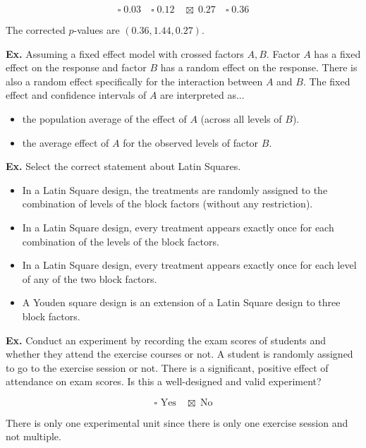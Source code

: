 $$\square \; 0.03 \quad \square \; 0.12 \quad \boxtimes \; 0.27 \quad \square \; 0.36 $$

The corrected $p$-values are $(0.36, 1.44, 0.27)$.


\hrulefill

\textbf{Ex.} Assuming a fixed effect model with crossed factors $A, B$. Factor $A$ has a fixed effect on the response and factor $B$ has a random effect on the response. There is also a random effect specifically for the interaction between $A$ and $B$. The fixed effect and confidence intervals of $A$ are interpreted as...

\begin{itemize}
	\item[$\boxtimes$] the population average of the effect of $A$ (across all levels of $B$).
	\item[$\square$] the average effect of $A$ for the observed levels of factor $B$.
\end{itemize}


\hrulefill

\textbf{Ex.} Select the correct statement about Latin Squares.

\begin{itemize}
	\item[$\square$] In a Latin Square design, the treatments are randomly assigned to the combination of levels of the block factors (without any restriction).
	\item[$\square$] In a Latin Square design, every treatment appears exactly once for each combination of the levels of the block factors.
	\item[$\boxtimes$] In a Latin Square design, every treatment appears exactly once for each level of any of the two block factors.
	\item[$\square$] A Youden square design is an extension of a Latin Square design to three block factors.
\end{itemize}


\hrulefill

\textbf{Ex.} Conduct an experiment by recording the exam scores of students and whether they attend the exercise courses or not. A student is randomly assigned to go to the exercise session or not. There is a significant, positive effect of attendance on exam scores. Is this a well-designed and valid experiment?

$$\square \text{ Yes} \quad \boxtimes \text{ No}$$


There is only one experimental unit since there is only one exercise session and not multiple.



